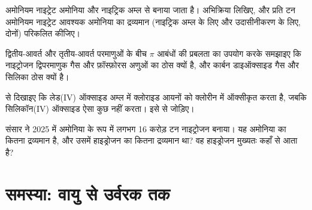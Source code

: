 \begin{exercise}[$\star\star$]\label{exo:b1:p-block-13-15:9}
अमोनियम नाइट्रेट अमोनिया और नाइट्रिक अम्ल से बनाया जाता है। अभिक्रिया लिखिए,
और प्रति टन अमोनियम नाइट्रेट आवश्यक अमोनिया का द्रव्यमान (नाइट्रिक अम्ल के लिए और
उदासीनीकरण के लिए, दोनों) परिकलित कीजिए।
\end{exercise}

\begin{exercise}[$\star\star\star$]\label{exo:b1:p-block-13-15:10}
द्वितीय-आवर्त और तृतीय-आवर्त परमाणुओं के बीच $\pi$ आबंधों की प्रबलता का उपयोग करके
समझाइए कि नाइट्रोजन द्विपरमाणुक गैस और फ़ॉस्फ़ोरस 
अणुओं का ठोस क्यों है, और कार्बन डाइऑक्साइड गैस और सिलिका ठोस क्यों है।
\end{exercise}

\begin{exercise}[$\star\star\star$]\label{exo:b1:p-block-13-15:11}
 से दिखाइए कि लेड(IV) ऑक्साइड अम्ल में क्लोराइड
आयनों को क्लोरीन में ऑक्सीकृत करता है, जबकि सिलिकॉन(IV) ऑक्साइड ऐसा कुछ
नहीं करता। इसे  से जोड़िए।
\end{exercise}

\begin{exercise}[$\star\star\star$]\label{exo:b1:p-block-13-15:12}
संसार ने 2025 में अमोनिया के रूप में लगभग 16 करोड़ टन नाइट्रोजन बनाया।
यह अमोनिया का कितना द्रव्यमान है, और उसमें हाइड्रोजन का कितना द्रव्यमान था?
वह हाइड्रोजन मुख्यतः कहाँ से आता है?
\end{exercise}

\section{समस्या: वायु से उर्वरक तक}

